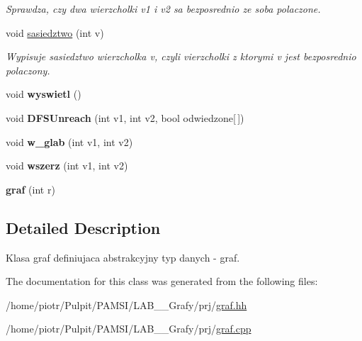 \begin{DoxyCompactItemize}
\begin{DoxyCompactList}\small\item\em \-Sprawdza, czy dwa wierzcholki v1 i v2 sa bezposrednio ze soba polaczone. \end{DoxyCompactList}\item 
\hypertarget{classgraf_a81ba0576d3d2b08441dcc11eea9bfdd8}{void \hyperlink{classgraf_a81ba0576d3d2b08441dcc11eea9bfdd8}{sasiedztwo} (int v)}\label{classgraf_a81ba0576d3d2b08441dcc11eea9bfdd8}

\begin{DoxyCompactList}\small\item\em \-Wypisuje sasiedztwo wierzcholka v, czyli vierzcholki z ktorymi v jest bezposrednio polaczony. \end{DoxyCompactList}\item 
\hypertarget{classgraf_a878b3202a5814261308436cd2ac08d80}{void {\bfseries wyswietl} ()}\label{classgraf_a878b3202a5814261308436cd2ac08d80}

\item 
\hypertarget{classgraf_a3f757bf26a3e1466a20c505e5db637ca}{void {\bfseries \-D\-F\-S\-Unreach} (int v1, int v2, bool odwiedzone\mbox{[}$\,$\mbox{]})}\label{classgraf_a3f757bf26a3e1466a20c505e5db637ca}

\item 
\hypertarget{classgraf_a7d2f807964ecedb5bc8e731a81e86946}{void {\bfseries w\-\_\-glab} (int v1, int v2)}\label{classgraf_a7d2f807964ecedb5bc8e731a81e86946}

\item 
\hypertarget{classgraf_afb6519bf2325ac6d4ea38512b1d78eab}{void {\bfseries wszerz} (int v1, int v2)}\label{classgraf_afb6519bf2325ac6d4ea38512b1d78eab}

\item 
\hypertarget{classgraf_a19c198b4c7309ab2d92c21eec870ee7f}{{\bfseries graf} (int r)}\label{classgraf_a19c198b4c7309ab2d92c21eec870ee7f}

\end{DoxyCompactItemize}


\subsection{\-Detailed \-Description}
\-Klasa graf definiujaca abstrakcyjny typ danych -\/ graf. 

\-The documentation for this class was generated from the following files\-:\begin{DoxyCompactItemize}
\item 
/home/piotr/\-Pulpit/\-P\-A\-M\-S\-I/\-L\-A\-B\-\_\-\_\-\-Grafy/prj/\hyperlink{graf_8hh}{graf.\-hh}\item 
/home/piotr/\-Pulpit/\-P\-A\-M\-S\-I/\-L\-A\-B\-\_\-\_\-\-Grafy/prj/\hyperlink{graf_8cpp}{graf.\-cpp}\end{DoxyCompactItemize}
